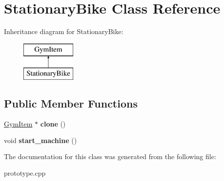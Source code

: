 \hypertarget{class_stationary_bike}{}\section{Stationary\+Bike Class Reference}
\label{class_stationary_bike}
Inheritance diagram for Stationary\+Bike\+:\begin{figure}[H]
\begin{center}
\leavevmode
\includegraphics[height=2.000000cm]{class_stationary_bike}
\end{center}
\end{figure}
\subsection*{Public Member Functions}
\begin{DoxyCompactItemize}
\item 
\hyperlink{class_gym_item}{Gym\+Item} $\ast$ {\bfseries clone} ()\hypertarget{class_stationary_bike_a1bc68c2ac559ec24cfd2829005d38c39}{}\label{class_stationary_bike_a1bc68c2ac559ec24cfd2829005d38c39}

\item 
void {\bfseries start\+\_\+machine} ()\hypertarget{class_stationary_bike_a5aef9ee065dbbe58d48613443cf651cb}{}\label{class_stationary_bike_a5aef9ee065dbbe58d48613443cf651cb}

\end{DoxyCompactItemize}


The documentation for this class was generated from the following file\+:\begin{DoxyCompactItemize}
\item 
prototype.\+cpp\end{DoxyCompactItemize}

